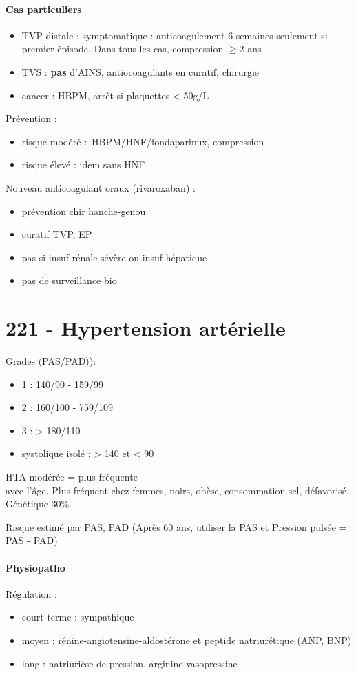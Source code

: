 \paragraph{Cas particuliers}
\begin{itemize}
  \item 
TVP distale : symptomatique : anticoagulement 6 semaines seulement si premier épisode. Dans tous les cas,
compression $\ge 2$ ans
\item \gls{TVS} : \textbf{pas} d'AINS, antiocoagulants en curatif, chirurgie
\item cancer : HBPM, arrêt si plaquettes < 50g/L
\end{itemize}
Prévention : 
\begin{itemize}
  \item risque modéré : HBPM/HNF/fondaparinux, compression
  \item risque élevé : idem sans HNF
\end{itemize}

Nouveau anticoagulant oraux (rivaroxaban) :
\begin{itemize}
  \item prévention chir hanche-genou
  \item curatif TVP, EP
  \item pas si insuf rénale sévère ou insuf hépatique
  \item pas de surveillance bio
\end{itemize}

\section{221 - Hypertension artérielle}%
\label{sec:221_hypertension_arterielle}
Grades (\gls{PAS}/\gls{PAD})):
\begin{itemize}
  \item 1 : 140/90 - 159/99
  \item 2 : 160/100 - 759/109
  \item 3 : > 180/110
  \item systolique isolé : > 140 et < 90
\end{itemize}

HTA modérée = plus fréquente\\
\inc avec l'âge. Plus fréquent chez femmes, noirs, obèse, consommation sel,
défavorisé. Génétique 30\%.

Risque estimé par PAS, PAD (Après 60 ans, utiliser la PAS et Pression pulsée = PAS - PAD)

\paragraph{Physiopatho}
Régulation :
\begin{itemize}
  \item court terme : sympathique 
  \item moyen : rénine-angiotensine-aldostérone et peptide natriurétique (ANP,
    BNP)
  \item long : natriurièse de pression, arginine-vasopressine
\end{itemize}

